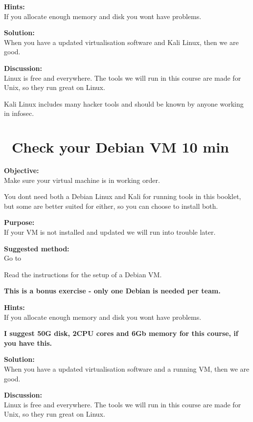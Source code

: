 \documentclass[a4paper,11pt,notitlepage]{report}
\begin{document}
{\bf Hints:}\\
If you allocate enough memory and disk you wont have problems.

{\bf Solution:}\\
When you have a updated virtualisation software and Kali Linux, then we are good.

{\bf Discussion:}\\
Linux is free and everywhere. The tools we will run in this course are made for Unix, so they run great on Linux.

Kali Linux includes many hacker tools and should be known by anyone working in infosec.

\chapter{\faInfoCircle\ Check your Debian VM 10 min}
\label{ex:sw-basicDebianVM}


{\bf Objective:}\\
Make sure your virtual machine is in working order.

You dont need both a Debian Linux and Kali for running tools in this booklet, but some are better suited for either, so you can choose to install both.

{\bf Purpose:}\\
If your VM is not installed and updated we will run into trouble later.

{\bf Suggested method:}\\
Go to 

Read the instructions for the setup of a Debian VM.

{\Large \bf This is a bonus exercise - only one Debian is needed per team.}

{\bf Hints:}\\
If you allocate enough memory and disk you wont have problems.

{\bf I suggest 50G disk, 2CPU cores and 6Gb memory for this course, if you have this.}

{\bf Solution:}\\
When you have a updated virtualisation software and a running VM, then we are good.

{\bf Discussion:}\\
Linux is free and everywhere. The tools we will run in this course are made for Unix, so they run great on Linux.
\end{document}
